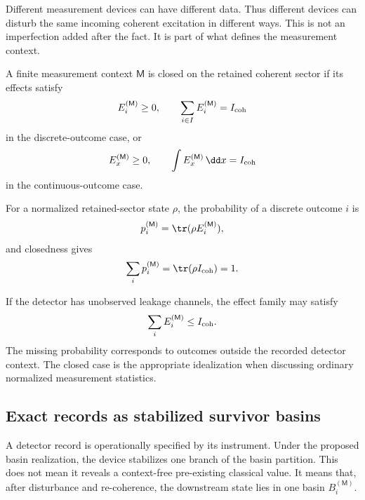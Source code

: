 \documentclass[11pt]{article}
\newcommand{\Meas}{\mathsf M}
\begin{document}
Different measurement devices can have different data. Thus different devices can disturb
the same incoming coherent excitation in different ways. This is not an imperfection added
after the fact. It is part of what defines the measurement context.

\begin{definition}
\label{def:closed-finite-measurement}
A finite measurement context \(\Meas\) is closed on the retained coherent sector if its effects
satisfy
\begin{equation}
  E_i^{(\Meas)}\ge0,
  \qquad
  \sum_{i\in I}E_i^{(\Meas)}=I_{\rm coh}
  \label{eq:closed-discrete-povm}
\end{equation}
in the discrete-outcome case, or
\begin{equation}
  E_x^{(\Meas)}\ge0,
  \qquad
  \int E_x^{(\Meas)}\,\dd x=I_{\rm coh}
  \label{eq:closed-continuous-povm}
\end{equation}
in the continuous-outcome case.
\end{definition}

For a normalized retained-sector state \(\rho\), the probability of a discrete outcome \(i\) is
\begin{equation}
  p_i^{(\Meas)}
  =
  \tr(\rho E_i^{(\Meas)}),
  \label{eq:discrete-outcome-prob}
\end{equation}
and closedness gives
\begin{equation}
  \sum_i p_i^{(\Meas)}
  =
  \tr(\rho I_{\rm coh})
  =
  1.
\end{equation}

\begin{remark}
\label{rem:open-measurement-contexts}
If the detector has unobserved leakage channels, the effect family may satisfy
\begin{equation}
  \sum_i E_i^{(\Meas)}\le I_{\rm coh}.
\end{equation}
The missing probability corresponds to outcomes outside the recorded detector context. The
closed case is the appropriate idealization when discussing ordinary normalized measurement
statistics.
\end{remark}

\subsection{Exact records as stabilized survivor basins}
\label{subsec:exact-records}

A detector record is operationally specified by its instrument. Under the proposed basin
realization, the device stabilizes one branch of the basin partition. This does not mean it reveals a context-free
pre-existing classical value. It means that, after disturbance and re-coherence, the downstream
state lies in one basin \(B_i^{(\Meas)}\).
\end{document}
